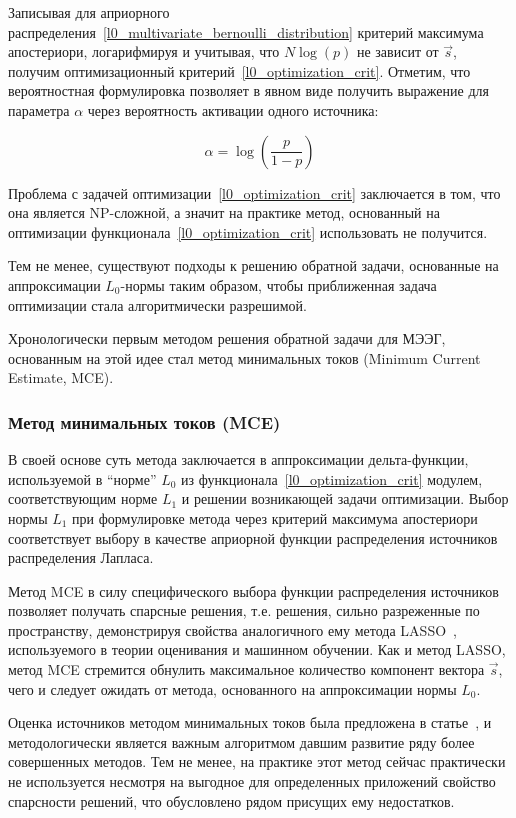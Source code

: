 Записывая для априорного
распределения~\ref{l0_multivariate_bernoulli_distribution} критерий максимума
апостериори, логарифмируя и учитывая, что $N\log(p)$ не зависит от $\vec{s}$,
получим оптимизационный критерий~\ref{l0_optimization_crit}. Отметим, что
вероятностная формулировка позволяет в явном виде получить выражение для
параметра $\alpha$ через вероятность активации одного источника:

\begin{equation}
    \alpha = \log\left(\frac{p}{1-p}\right)
\end{equation}


Проблема с задачей оптимизации~\ref{l0_optimization_crit} заключается в том,
что она является NP-сложной, а значит на практике метод, основанный на
оптимизации функционала~\ref{l0_optimization_crit} использовать не получится.

Тем не менее, существуют подходы к решению обратной задачи,
основанные на аппроксимации $L_0$-нормы таким образом, чтобы
приближенная задача оптимизации стала алгоритмически разрешимой.

Хронологически первым методом решения обратной задачи для МЭЭГ,
основанным на этой идее стал метод минимальных токов
(Minimum Current Estimate, MCE).

\subsubsection{Метод минимальных токов (MCE)}

В своей основе суть метода заключается в аппроксимации дельта-функции,
используемой в ``норме'' $L_0$ из функционала~\ref{l0_optimization_crit} модулем,
соответствующим норме $L_1$ и решении возникающей задачи оптимизации. Выбор
нормы $L_1$ при формулировке метода через критерий максимума апостериори
соответствует выбору в качестве априорной функции распределения источников
распределения Лапласа.

Метод MCE в силу специфического выбора функции распределения источников
позволяет получать спарсные решения, т.е. решения, сильно разреженные по
пространству, демонстрируя свойства аналогичного ему метода
LASSO~\cite{Tibshirani1996}, используемого в теории оценивания и машинном обучении.
Как и метод LASSO, метод MCE стремится обнулить максимальное количество
компонент вектора $\vec{s}$, чего и следует ожидать от метода, основанного
на аппроксимации нормы $L_0$.

Оценка источников методом минимальных токов была
предложена в статье~\cite{Uutela1999}, и методологически является важным алгоритмом
давшим развитие ряду более совершенных методов. Тем не менее, на практике этот
метод сейчас практически не используется несмотря на выгодное для определенных
приложений свойство спарсности решений, что обусловлено рядом присущих ему
недостатков.

